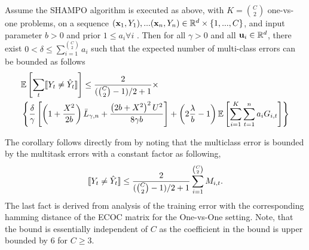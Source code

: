 \begin{corollary}
Assume the SHAMPO algorithm is executed as above, with $K={C \choose 2}$ one-vs-one problems, 
on a sequence $(\mathbf{x}_1,Y_1),...(\mathbf{x}_n,Y_n)\in\mathbb{R}^d\times\{1,...,C\}$, and input parameter 
$b>0$ and prior $1\le a_i\forall i$ . Then for all $\gamma>0$ and all $\mathbf{u}_{i}\in\mathbb{R}^d$, 
there exist $0<\delta\le \sum_{i=1}^{C \choose 2}a_{i}$ such that the expected number of multi-class 
errors can be bounded as follows
 \[
 \begin{split}
 &\mathbb{E}\left[{\sum_t [\![{Y_t \neq \hat{Y}_t}]\!]}\right]\le \frac{2}{({C \choose 2}-1)/2+1}\times\\
 &\left\{{ \frac{\delta}{\gamma}\left[{\left({1+\frac{X^2}{2b} }\right){\bar L}_{\gamma,n}+\frac{\left({{2b+X^2}}\right)^2U^{2}}{8{\gamma}b}}\right]+\left({2\frac{\lambda}{b}-1}\right)\mathbb{E}\left[{\sum_{i=1}^{K}\sum_{t=1}^{n}{a_{i}G_{i,t}}}\right]}\right\}
 \end{split}
 \]

\end{corollary}
The corollary follows directly from  by noting that the  multiclass error 
is bounded by the multitask errors with a constant factor as following, 
\[
[\![{Y_t \neq \hat{Y}_t}]\!] \leq \frac{2}{({C \choose 2}-1)/2+1}\sum_{i=1}^{ {C \choose 2}} M_{i,t}. 
\]
The last fact is derived from \cite{allwein2001reducing} analysis of the training error 
with the corresponding hamming distance of the ECOC matrix for the One-vs-One 
setting. Note, that the bound is essentially  independent of $C$ as the coefficient in the bound is upper 
bounded by $6$  for $C \geq 3$.


